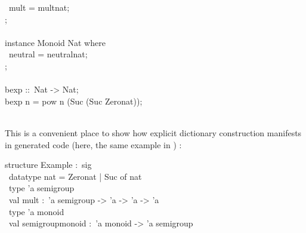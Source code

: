 \begin{isabellebody}
\begin{isamarkuptext}
\hspace*{0pt} ~mult = mult{}nat;\\
\hspace*{0pt}{\char125};\\
\hspace*{0pt}\\
\hspace*{0pt}instance Monoid Nat where {}\\
\hspace*{0pt} ~neutral = neutral{}nat;\\
\hspace*{0pt}{\char125};\\
\hspace*{0pt}\\
\hspace*{0pt}bexp ::~Nat -> Nat;\\
\hspace*{0pt}bexp n = pow n (Suc (Suc Zero{}nat));\\
\hspace*{0pt}\\
\hspace*{0pt}{\char125}%
\end{isamarkuptext}%
\isamarkuptrue%
%
\endisatagquote
{\isafoldquote}%
%
\isadelimquote
%
\endisadelimquote
%
\begin{isamarkuptext}%
\noindent This is a convenient place to show how explicit dictionary construction
  manifests in generated code (here, the same example in )
  \cite{Haftmann-Nipkow:2010:code}:%
\end{isamarkuptext}%
\isamarkuptrue%
%
\isadelimquote
%
\endisadelimquote
%
\isatagquote
%
\begin{isamarkuptext}%
\isatypewriter%
\noindent%
\hspace*{0pt}structure Example :~sig\\
\hspace*{0pt} ~datatype nat = Zero{}nat | Suc of nat\\
\hspace*{0pt} ~type 'a semigroup\\
\hspace*{0pt} ~val mult :~'a semigroup -> 'a -> 'a -> 'a\\
\hspace*{0pt} ~type 'a monoid\\
\hspace*{0pt} ~val semigroup{}monoid :~'a monoid -> 'a semigroup\\

\end{isamarkuptext}
\end{isabellebody}
